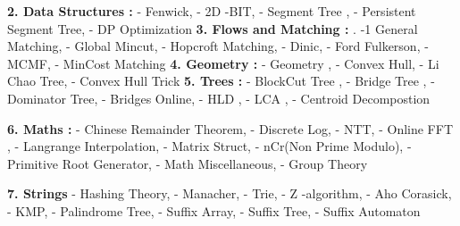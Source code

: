 \documentclass[12pt]{extarticle}
\author{
	Ayush Ranjan, Naman Jain, Manish Tanwar
}
\begin{document}
\maketitle
		\begin{multicols*}{2}
			
			\setlength{\parskip}{0.0in}
			\setlength{\parskip}{0.0in}
			
			\textbf{2. Data Structures : }
			 -  Fenwick, - 2D -BIT,  - Segment Tree ,  - Persistent Segment Tree,  - DP Optimization
			\newline
			\textbf{3. Flows and Matching : }
			. -1  General Matching,  - Global Mincut,  - Hopcroft Matching,  - Dinic,  - Ford Fulkerson,  - MCMF,  - MinCost Matching
			\newline
			\textbf{4. Geometry : }
			 -  Geometry ,  - Convex Hull,  - Li Chao Tree,  - Convex Hull Trick
						\newline
			\textbf{5. Trees : }
			 -  BlockCut Tree ,  - Bridge Tree ,  - Dominator Tree,  - Bridges Online,  - HLD ,  - LCA ,  - Centroid Decompostion
			\newline
			
			\textbf{6. Maths : }
			 -  Chinese Remainder Theorem,  - Discrete Log,  - NTT,  - Online FFT ,  - Langrange Interpolation,  - Matrix Struct,  - nCr(Non Prime Modulo),  - Primitive Root Generator,  - Math Miscellaneous,  -  Group Theory
			
			\textbf{7. Strings}
			 - Hashing Theory,  - Manacher,  - Trie,  - Z -algorithm,  - Aho Corasick,  - KMP,  - Palindrome Tree,  - Suffix Array,  - Suffix Tree,  - Suffix Automaton
			\newline
			\newline
			
						

\end{multicols*}
\end{document}
